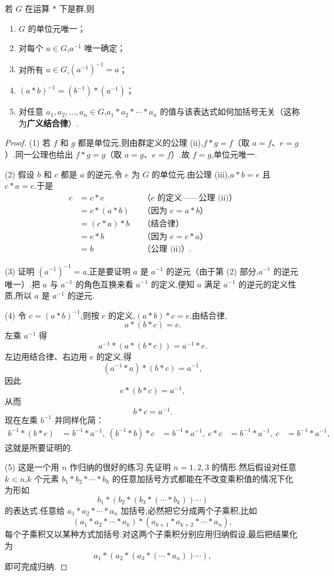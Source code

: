 \begin{proposition}
	若 $G$ 在运算 $*$ 下是群,则
\begin{enumerate}[label=(\arabic*)]
	\item $G$ 的单位元唯一；
	\item 对每个 $a\in G$,$a^{-1}$ 唯一确定；
	\item 对所有 $a\in G$,$(a^{-1})^{-1}=a$；
	\item $(a*b)^{-1}=(b^{-1})*(a^{-1})$；
	\item 对任意 $a_1,a_2,\ldots,a_n\in G$,$a_1*a_2*\cdots*a_n$ 的值与该表达式如何加括号无关（这称为\textbf{广义结合律}）.
\end{enumerate}
\end{proposition}
\newpage
\begin{proof}
	(1) 若 $f$ 和 $g$ 都是单位元,则由群定义的公理 (ii),$f*g=f$（取 $a=f$、$e=g$）.同一公理也给出 $f*g=g$（取 $a=g$、$e=f$）.故 $f=g$,单位元唯一.
	
	(2) 假设 $b$ 和 $c$ 都是 $a$ 的逆元,令 $e$ 为 $G$ 的单位元.由公理 (iii),$a*b=e$ 且 $c*a=e$.于是
	\begin{align*}
		c &= c*e &&\text{（$e$ 的定义——公理 (ii)）}\\
		&= c*(a*b) &&\text{（因为 $e=a*b$）}\\
		&= (c*a)*b &&\text{（结合律）}\\
		&= e*b &&\text{（因为 $e=c*a$）}\\
		&= b &&\text{（公理 (ii)）.}
	\end{align*}
	
	(3) 证明 $(a^{-1})^{-1}=a$,正是要证明 $a$ 是 $a^{-1}$ 的逆元（由于第 (2) 部分,$a^{-1}$ 的逆元唯一）.把 $a$ 与 $a^{-1}$ 的角色互换来看 $a^{-1}$ 的定义,便知 $a$ 满足 $a^{-1}$ 的逆元的定义性质,所以 $a$ 是 $a^{-1}$ 的逆元.
	
	(4) 令 $c=(a*b)^{-1}$,则按 $c$ 的定义,$(a*b)*c=e$.由结合律,
	\[
	a*(b*c)=e.
	\]
	左乘 $a^{-1}$ 得
	\[
	a^{-1}*(a*(b*c))=a^{-1}*e.
	\]
	左边用结合律、右边用 $e$ 的定义,得
	\[
	(a^{-1}*a)*(b*c)=a^{-1},
	\]
	因此
	\[
	e*(b*c)=a^{-1},
	\]
	从而
	\[
	b*c=a^{-1}.
	\]
	现在左乘 $b^{-1}$ 并同样化简：
	\begin{align*}
		b^{-1}*(b*c)&=b^{-1}*a^{-1},\
		(b^{-1}*b)*c&=b^{-1}*a^{-1},\
		e*c&=b^{-1}*a^{-1},\
		c&=b^{-1}*a^{-1},
	\end{align*}
	这就是所要证明的.
	
	(5) 这是一个用 $n$ 作归纳的很好的练习.先证明 $n=1,2,3$ 的情形.然后假设对任意 $k<n$,$k$ 个元素 $b_1*b_2*\cdots*b_k$ 的任意加括号方式都能在不改变乘积值的情况下化为形如
	\[
	b_1*(b_2*(b_3*(\cdots*b_k))\cdots)
	\]
	的表达式.任意给 $a_1*a_2*\cdots*a_n$ 加括号,必然把它分成两个子乘积,比如
	\[
	(a_1*a_2*\cdots*a_k)*(a_{k+1}*a_{k+2}*\cdots*a_n),
	\]
	每个子乘积又以某种方式加括号.对这两个子乘积分别应用归纳假设,最后把结果化为
	\[
	a_1*(a_2*(a_3*(\cdots*a_n))\cdots),
	\]
	即可完成归纳.
\end{proof}
